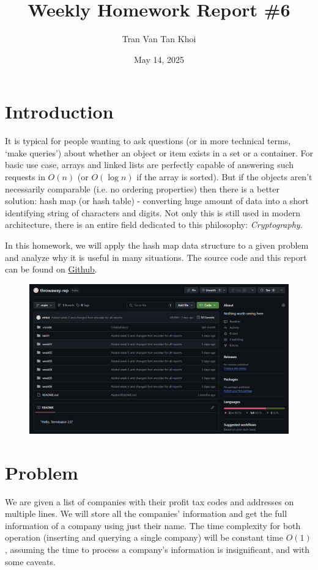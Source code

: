 \documentclass{article}
\author{Tran Van Tan Khoi}
\date{May 14, 2025}
\title{Weekly Homework Report \#6}
\begin{document}
\maketitle

\section{Introduction}
\label{introduction}

It is typical for people wanting to ask questions (or in more technical terms, `make queries') about whether an object or item exists in a set or a container. For basic use case, arrays and linked lists are perfectly capable of answering such requests in $O(n)$ (or $O(\log n)$ if the array is sorted). But if the objects aren't necessarily comparable (i.e. no ordering properties) then there is a better solution: hash map (or hash table) - converting huge amount of data into a short identifying string of characters and digits. Not only this is still used in modern architecture, there is an entire field dedicated to this philosophy: \emph{Cryptography}.

In this homework, we will apply the hash map data structure to a given problem and analyze why it is useful in many situations. The source code and this report can be found on \href{https://github.com/xtrkoi/throwaway-rep}{Github}.

\begin{figure}[h]
    \centering
    \includegraphics[width=12cm]{images/github_page.png}
\end{figure}

\section{Problem}
\label{problem}

We are given a list of companies with their profit tax codes and addresses on multiple lines. We will store all the companies' information and get the full information of a company using just their name. The time complexity for both operation (inserting and querying a single company) will be constant time $O(1)$, assuming the time to process a company's information is insignificant, and with some caveats.
\end{document}
